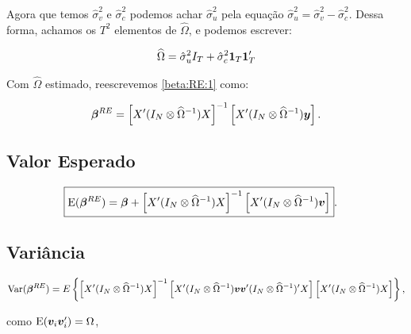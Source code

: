 \documentclass[11pt, oneside, a4paper, article]{article}
\numberwithin{equation}{section}
\begin{document}
\begin{description}
\begin{description}
Agora que temos $\hat{\sigma}^2_{v}$ e $\hat{\sigma}^2_{c}$ podemos achar $\hat{\sigma}^{2}_{u}$ pela equação $\boxed{\hat{\sigma}_{u}^{2} = \hat{\sigma}_{v}^{2} - \hat{\sigma}_{c}^{2}}$.
Dessa forma, achamos os $T^2$ elementos de $\widehat{\Omega}$, e podemos escrever:

\vspace{-1 em}
\begin{align*}
\widehat{\Omega}
= 
\hat{\sigma}^{2}_{u} I_{T} + \hat{\sigma}_{c}^{2} \boldsymbol{1}_{T} \boldsymbol{1}_{T}'
\end{align*}

Com $\widehat{\Omega}$ estimado, reescrevemos \eqref{beta:RE:1} como:

\vspace{-1 em}
\begin{align} \label{beta:RE:2}
\boldsymbol{\beta}^{RE} = 
\left[ X' (I_{N} \otimes \widehat{\Omega}^{-1}) X \right]^{-1}
\left[ X' (I_{N} \otimes \widehat{\Omega}^{-1}) \boldsymbol{y} \right].
\end{align}


\subsection*{Valor Esperado}

\vspace{-1 em}
\begin{align*}
	\Aboxed{
\E( \mbs{\beta}^{RE} ) = 
\mbs{\beta} +
\left[ X' (I_{N} \otimes \widehat{\Omega}^{-1}) X \right]^{-1}
\left[ X' (I_{N} \otimes \widehat{\Omega}^{-1}) \mbs{v} \right] }.
\end{align*}

\subsection*{Variância}

\vspace{-1 em}
\begin{align*} 
\text{Var}( \boldsymbol{\beta}^{RE} ) = 
E
\left\{ 
\left[ X' ( I_{N} \otimes \widehat{\Omega}^{-1} ) X \right]^{-1}
\left[
X' ( I_{N} \otimes \widehat{\Omega}^{-1} )
\boldsymbol{v} \boldsymbol{v}'
( I_{N} \otimes \widehat{\Omega}^{-1} )' X
\right]
\left[ X' ( I_{N} \otimes \widehat{\Omega}^{-1} ) X \right]
\right\},
\end{align*}

\noindent
como $\text{E}( \boldsymbol{v}_{i} \boldsymbol{v}_{i}' ) =\Omega$,


\end{description}
\end{description}
\end{document}
